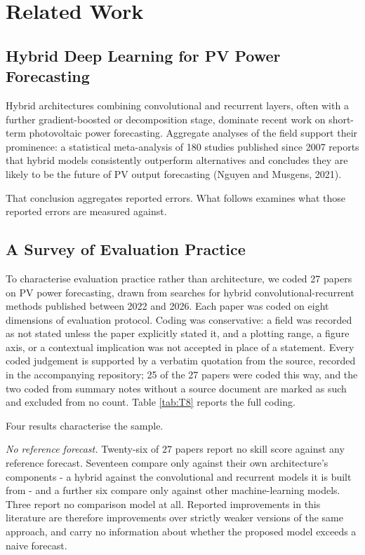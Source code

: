 \section{Related Work}

\subsection{Hybrid Deep Learning for PV Power Forecasting}

Hybrid architectures combining convolutional and recurrent layers, often
with a further gradient-boosted or decomposition stage, dominate recent
work on short-term photovoltaic power forecasting. Aggregate analyses of
the field support their prominence: a statistical meta-analysis of 180
studies published since 2007 reports that hybrid models consistently
outperform alternatives and concludes they are likely to be the future of
PV output forecasting (Nguyen and Musgens, 2021).

That conclusion aggregates reported errors. What follows examines what
those reported errors are measured against.

\subsection{A Survey of Evaluation Practice}

To characterise evaluation practice rather than architecture, we coded 27
papers on PV power forecasting, drawn from searches for hybrid
convolutional-recurrent methods published between 2022 and 2026. Each
paper was coded on eight dimensions of evaluation protocol. Coding was
conservative: a field was recorded as not stated unless the paper
explicitly stated it, and a plotting range, a figure axis, or a
contextual implication was not accepted in place of a statement. Every
coded judgement is supported by a verbatim quotation from the source,
recorded in the accompanying repository; 25 of the 27 papers were coded
this way, and the two coded from summary notes without a source document
are marked as such and excluded from no count. Table \ref{tab:T8} reports the
full coding.



Four results characterise the sample.

\textit{No reference forecast.} Twenty-six of 27 papers report no skill score
against any reference forecast. Seventeen compare only against their own
architecture's components - a hybrid against the convolutional and
recurrent models it is built from - and a further six compare only
against other machine-learning models. Three report no comparison model
at all. Reported improvements in this literature are therefore
improvements over strictly weaker versions of the same approach, and
carry no information about whether the proposed model exceeds a naive
forecast.

